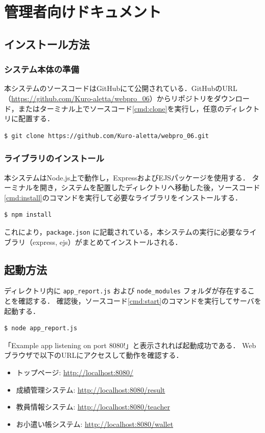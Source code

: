 \section{管理者向けドキュメント}
\subsection{インストール方法}
\subsubsection{システム本体の準備}
本システムのソースコードはGitHubにて公開されている．GitHubのURL（\url{https://github.com/Kuro-aletta/webpro_06}）からリポジトリをダウンロード，またはターミナル上でソースコード\ref{cmd:clone}を実行し，任意のディレクトリに配置する．
\begin{lstlisting}[caption=システム本体のクローン, label=cmd:clone]
$ git clone https://github.com/Kuro-aletta/webpro_06.git
\end{lstlisting}

\subsubsection{ライブラリのインストール}
本システムはNode.js上で動作し，ExpressおよびEJSパッケージを使用する．
ターミナルを開き，システムを配置したディレクトリへ移動した後，ソースコード\ref{cmd:install}のコマンドを実行して必要なライブラリをインストールする．

\begin{lstlisting}[caption=ライブラリのインストール, label=cmd:install]
$ npm install
\end{lstlisting}
これにより，\texttt{package.json} に記載されている，本システムの実行に必要なライブラリ（express, ejs）がまとめてインストールされる．

\subsection{起動方法}
ディレクトリ内に \texttt{app\_report.js} および \texttt{node\_modules} フォルダが存在することを確認する．
確認後，ソースコード\ref{cmd:start}のコマンドを実行してサーバを起動する．
\begin{lstlisting}[caption=システムの起動, label=cmd:start]
$ node app_report.js
\end{lstlisting}
「Example app listening on port 8080!」と表示されれば起動成功である．
Webブラウザで以下のURLにアクセスして動作を確認する．
\begin{itemize}
    \item トップページ: \url{http://localhost:8080/}
    \item 成績管理システム: \url{http://localhost:8080/result}
    \item 教員情報システム: \url{http://localhost:8080/teacher}
    \item お小遣い帳システム: \url{http://localhost:8080/wallet}
\end{itemize}

